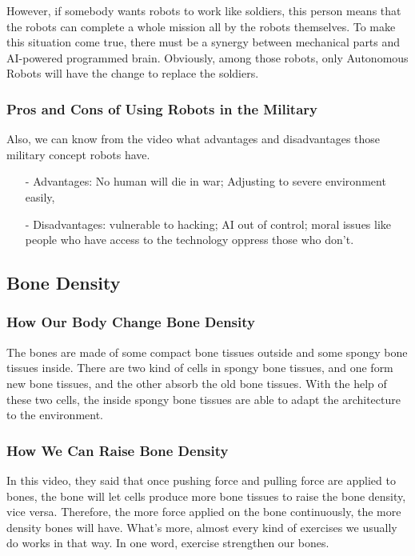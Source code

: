 \documentclass{article}
\begin{document}
However, if somebody wants robots to work like soldiers, this person means that the robots can complete a whole mission all by the robots themselves. To make this situation come true, there must be a synergy between mechanical parts and AI-powered programmed brain. Obviously, among those robots, only Autonomous Robots will have the change to replace the soldiers.

\subsubsection{Pros and Cons of Using Robots in the Military}

Also, we can know from the video what advantages and disadvantages those military concept robots have.
\begin{enumerate}
	\item[-] Advantages: No human will die in war; Adjusting to severe environment easily,
	\item[-] Disadvantages: vulnerable to hacking; AI out of control; moral issues like people who have access to the technology oppress those who don't.
\end{enumerate}

\subsection{Bone Density}
\subsubsection{How Our Body Change Bone Density}
The bones are made of some compact bone tissues outside and some spongy bone tissues inside. There are two kind of cells in spongy bone tissues, and one form new bone tissues, and the other absorb the old bone tissues. With the help of these two cells, the inside spongy bone tissues are able to adapt the architecture to the environment. 

\subsubsection{How We Can Raise Bone Density}
In this video, they said that once pushing force and pulling force are applied to bones, the bone will let cells produce more bone tissues to raise the bone density, vice versa. Therefore, the more force applied on the bone continuously, the more density bones will have. What's more, almost every kind of exercises we usually do works in that way. In one word, exercise strengthen our bones.
\end{document}
